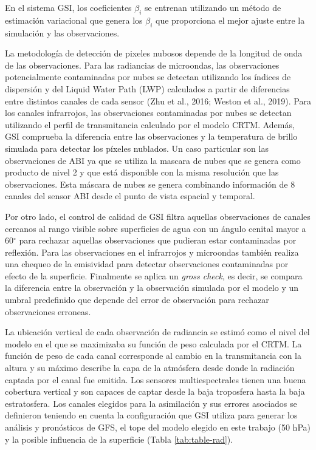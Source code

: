 \documentclass[12pt,oneside,a4paper]{reedthesis}
\begin{document}
En el sistema GSI, los coeficientes \(\beta_i\) se entrenan utilizando un método de estimación variacional que genera los \(\beta_i\) que proporciona el mejor ajuste entre la simulación y las observaciones.

La metodología de detección de pixeles nubosos depende de la longitud de onda de las observaciones. Para las radiancias de microondas, las observaciones potencialmente contaminadas por nubes se detectan utilizando los índices de dispersión y del Liquid Water Path (LWP) calculados a partir de diferencias entre distintos canales de cada sensor (Zhu et al., 2016; Weston et al., 2019). Para los canales infrarrojos, las observaciones contaminadas por nubes se detectan utilizando el perfil de transmitancia calculado por el modelo CRTM. Además, GSI comprueba la diferencia entre las observaciones y la temperatura de brillo simulada para detectar los píxeles nublados. Un caso particular son las observaciones de ABI ya que se utiliza la mascara de nubes que se genera como producto de nivel 2 y que está disponible con la misma resolución que las observaciones. Esta máscara de nubes se genera combinando información de 8 canales del sensor ABI desde el punto de vista espacial y temporal.

Por otro lado, el control de calidad de GSI filtra aquellas observaciones de canales cercanos al rango visible sobre superficies de agua con un ángulo cenital mayor a 60\(^{\circ}\) para rechazar aquellas observaciones que pudieran estar contaminadas por reflexión. Para las observaciones en el infrarrojos y microondas también realiza una chequeo de la emisividad para detectar observaciones contaminadas por efecto de la superficie. Finalmente se aplica un \emph{gross check}, es decir, se compara la diferencia entre la observación y la observación simulada por el modelo y un umbral predefinido que depende del error de observación para rechazar observaciones erroneas.

La ubicación vertical de cada observación de radiancia se estimó como el nivel del modelo en el que se maximizaba su función de peso calculada por el CRTM. La función de peso de cada canal corresponde al cambio en la transmitancia con la altura y su máximo describe la capa de la atmósfera desde donde la radiación captada por el canal fue emitida. Los sensores multiespectrales tienen una buena cobertura vertical y son capaces de captar desde la baja troposfera hasta la baja estratosfera. Los canales elegidos para la asimilación y sus errores asociados se definieron teniendo en cuenta la configuración que GSI utiliza para generar los análisis y pronósticos de GFS, el tope del modelo elegido en este trabajo (50 hPa) y la posible influencia de la superficie (Tabla \ref{tab:table-rad}).
\end{document}
